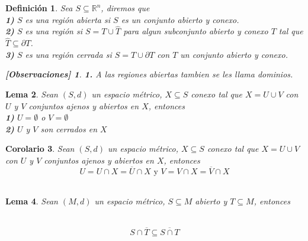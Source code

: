 \documentclass[oneside]{book} %
\theoremstyle{Teorema}
\newtheorem{Definicion}{Definición}[chapter]
\newtheorem{Corolario}[Definicion]{Corolario}
\newtheorem{Lema}[Definicion]{Lema}
\theoremstyle{Ejemplos}
\theoremstyle{[Obs]}
\newtheorem*{Obs}{[Observaciones]}
\renewcommand{\{}{\left\lbrace} %
\renewcommand{\}}{\right\rbrace} %
\renewcommand{\u}{\cup} %
\newcommand{\n}{\cap} %
\renewcommand{\sc}{\subseteq} %
\newcommand{\Rn}{\mathbb{R}^n} %
\begin{document}
			\begin{Definicion}
				
				Sea $S \sc \Rn$, diremos que \\

				\textbf{1)} $S$ es una región abierta si $S$ es un conjunto abierto y conexo. \\

				\textbf{2)} $S$ es una región si $S = T \u \hat{T}$ para algun subconjunto abierto y conexo $T$ tal que $\hat{T} \sc \partial T$. \\

				\textbf{3)} $S$ es una región cerrada si $S = T \u \partial T$ con $T$ un conjunto abierto y conexo. \\

				\begin{Obs}
				
					\hfill
				
					\textbf{1.} A las regiones abiertas tambien se les llama dominios. \\
				
				\end{Obs}

			\end{Definicion}

			\begin{Lema}
				
				Sean $(S, d)$ un espacio métrico, $X \sc S$ conexo tal que $X = U \u V$ con $U$ y $V$ conjuntos ajenos y abiertos en $X$, entonces \\

				\textbf{1)} $U = \emptyset$ o $V = \emptyset$ \\

				\textbf{2)} $U$ y $V$ son cerrados en $X$ \\

			\end{Lema}

			\begin{Corolario}
				
				Sean $(S, d)$ un espacio métrico, $X \sc S$ conexo tal que $X = U \u V$ con $U$ y $V$ conjuntos ajenos y abiertos en $X$, entonces \\
				
				\[ U = U \n X = \overline{U} \n X \text{ y } V = V \n X = \overline{V} \n X \] \\

			\end{Corolario}

			\begin{Lema}
				
				Sean $(M, d)$ un espacio métrico, $S \sc M$ abierto y $T \sc M$, entonces \\\

				\[ S \n \overline{T} \sc \overline{S \n T} \] \\

			\end{Lema}
\end{document}
